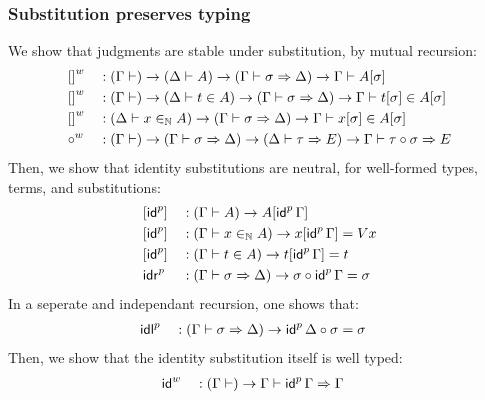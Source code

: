 \subsubsection{Substitution preserves typing}
  We show that judgments are stable under substitution, by mutual recursion:
\begin{alignat*}{5}
  & {[]}^w && : (\Gamma \vdash)\rightarrow(\Delta \vdash A)\rightarrow
  (\Gamma \vdash \sigma \Rightarrow \Delta) \rightarrow
  \Gamma \vdash A [ \sigma ]
  \\
  & {[]}^w && : (\Gamma \vdash)\rightarrow(\Delta \vdash t \in A)\rightarrow
  (\Gamma \vdash \sigma \Rightarrow \Delta) \rightarrow
  \Gamma \vdash t [\sigma] \in A [ \sigma ]
  \\
  & {[]}^w && : (\Delta \vdash x \in_{\mathbb{N}} A)\rightarrow
  (\Gamma \vdash \sigma \Rightarrow \Delta) \rightarrow
  \Gamma \vdash x [\sigma] \in A [ \sigma ]
  \\
  & {{\circ}}^w && :
  (\Gamma \vdash) \rightarrow
  (\Gamma \vdash \sigma \Rightarrow \Delta) \rightarrow
  (\Delta \vdash \tau \Rightarrow E) \rightarrow
  \Gamma \vdash \tau \circ \sigma \Rightarrow E
  \end{alignat*}
Then, we show that identity substitutions are neutral, for well-formed types,
terms, and substitutions:
\begin{alignat*}{5}
  & [{\mathsf{id}}^p] && : (\Gamma \vdash A)\rightarrow A [ {\mathsf{id}}^p\,\Gamma]  \\
  & [{\mathsf{id}}^p] && : (\Gamma \vdash x \in_{\mathbb{N}} A)\rightarrow x [ {\mathsf{id}}^p\,\Gamma] = V x \\
  & [{\mathsf{id}}^p] && : (\Gamma \vdash t \in A)\rightarrow t [ {\mathsf{id}}^p\,\Gamma] = t \\
  & {\mathsf{idr}}^p && : (\Gamma \vdash \sigma \Rightarrow\Delta)\rightarrow \sigma \circ {\mathsf{id}}^p\,\Gamma = \sigma
  \end{alignat*}
  In a seperate and independant recursion, one shows that:
  \begin{alignat*}{5}
  & {\mathsf{idl}}^p && : (\Gamma \vdash \sigma \Rightarrow\Delta)\rightarrow {\mathsf{id}}^p\,\Delta\circ \sigma = \sigma
  \end{alignat*}
  Then, we show that the identity substitution itself is well typed:
  \begin{alignat*}{5}
  & {\mathsf{id}}^w && : (\Gamma \vdash)\rightarrow \Gamma \vdash {\mathsf{id}}^p\,\Gamma \Rightarrow \Gamma
  \end{alignat*}



